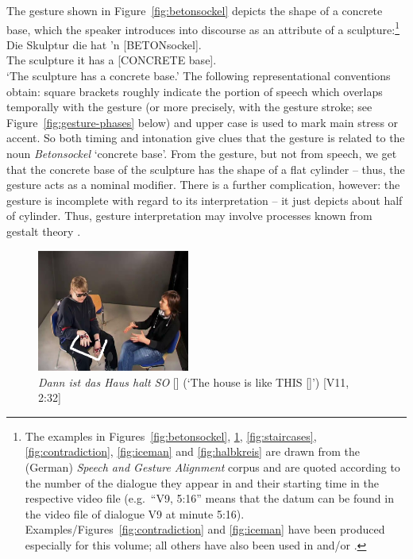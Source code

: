 \documentclass[output=paper]{langsci/langscibook}
\begin{document}
The gesture shown in Figure~\ref{fig:betonsockel} depicts the shape of a concrete base, which the speaker introduces into discourse as an attribute of a sculpture:\footnote{The examples in Figures~\ref{fig:betonsockel}, \ref{fig:so}, \ref{fig:staircases}, \ref{fig:contradiction}, \ref{fig:iceman} and \ref{fig:halbkreis} are drawn from the (German) \emph{Speech and Gesture Alignment} corpus \citep[,][]{Luecking:Bergmann:Hahn:Kopp:Rieser:2010} and are quoted according to the number of the dialogue they appear in and their starting time in the respective video file (e.g.\ \enquote{V9, 5:16} means that the datum can be found in the video file of dialogue V9 at minute 5:16). Examples/Figures~\ref{fig:contradiction} and \ref{fig:iceman} have been produced especially for this volume; all others have also been used in \citet{Luecking:2013:a} and/or \citet{Luecking:2016}.}
%
\ea \label{ex:betonsockel}
\gll Die Skulptur die hat 'n [BETONsockel]. \\
     The sculpture it has a {[CONCRETE base]}. \\
\glt \enquote*{The sculpture has a concrete base.}
\z
%
The following representational conventions obtain: square brackets roughly indicate the portion of speech which overlaps temporally with the gesture (or more precisely, with the gesture stroke; see Figure~\ref{fig:gesture-phases} below) and upper case is used to mark main stress or accent.
%
So both timing and intonation give clues that the gesture is related to the noun \emph{Betonsockel} `concrete base'.
%
From the gesture, but not from speech, we get that the concrete base of the sculpture has the shape of a flat cylinder -- thus, the gesture acts as a nominal modifier.
%
There is a further complication, however: the gesture is incomplete with regard to its interpretation -- it just depicts about half of cylinder. 
%
Thus, gesture interpretation may involve processes known from gestalt theory \citetext{see \citealp{Luecking:2016} on a \emph{good continuation}  constraint relevant to (\ref{ex:betonsockel})/Figure~\ref{fig:betonsockel}}.


\begin{figure}
  \centering
  \includegraphics[trim={1cm 0 5cm 5cm}, clip, width=5cm]{figures/mmsubcat2}
  \caption[Like this]{\textit{Dann ist das Haus halt SO} [] (\enquote*{The house is like THIS []}) [V11, 2:32]}
  \label{fig:so}
\end{figure}
\end{document}
